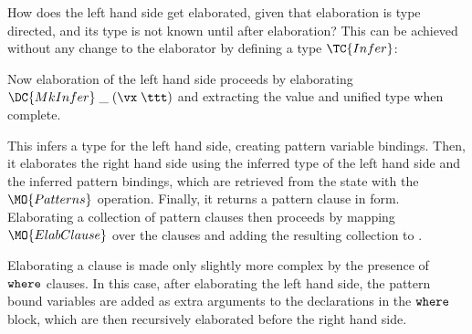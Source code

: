 
How does the left hand side get elaborated, given that elaboration is type directed, and
its type is not known until after elaboration? 
This can be achieved without any change to the elaborator by defining 
a type $\TC{Infer}$:


Now elaboration of the left hand side proceeds by elaborating $\DC{MkInfer}\;\_\;(\vx\;\ttt)$ and
extracting the value and unified type when complete.


This infers a type for the left hand side, creating pattern variable bindings. Then, 
it elaborates the right hand side using the inferred type of the left hand side
and the inferred pattern bindings, which are retrieved from the state with the
$\MO{Patterns}$ operation. Finally, it returns a pattern clause in \TT{} form.
Elaborating a collection of pattern clauses then proceeds by mapping $\MO{ElabClause}$ over
the clauses and adding the resulting collection to \TT{}.


Elaborating a clause is made only slightly more complex by the presence of
$\mathtt{where}$ clauses. In this case, after elaborating the left hand side, the pattern
bound variables are added as extra arguments to the declarations in the $\mathtt{where}$ block,
which are then recursively elaborated before the right hand side.


